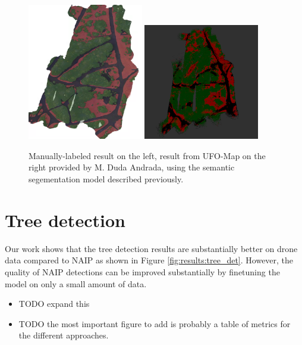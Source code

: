 \begin{figure}
    \centering
    \includegraphics[width=0.45\textwidth]{figs/results/semantic_mapping/labeled_orthomoasaic.png}
    \includegraphics[width=0.45\textwidth]{figs/results/semantic_mapping/segnext_gc5_ufomap.png}
    \caption{Manually-labeled result on the left, result from UFO-Map on the right provided by M. Duda Andrada, using the semantic segementation model described previously. }
    \label{fig:results:semantic_map_UFO}
\end{figure}

\section{Tree detection}
Our work shows that the tree detection results are substantially better on drone data compared to NAIP as shown in Figure \ref{fig:results:tree_det}. However, the quality of NAIP detections can be improved substantially by finetuning the model on only a small amount of data.

\begin{itemize}
    \item TODO expand this
    \item TODO the most important figure to add is probably a table of metrics for the different approaches.
\end{itemize}

